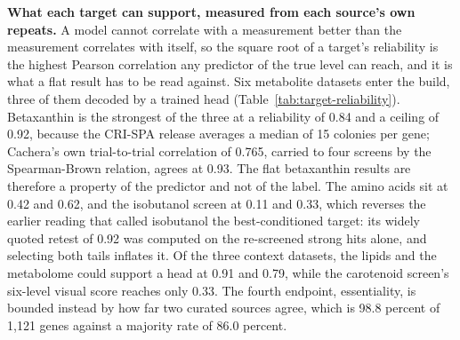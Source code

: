 
\textbf{What each target can support, measured from each source's own repeats.} A model
cannot correlate with a measurement better than the measurement correlates with itself, so
the square root of a target's reliability is the highest Pearson correlation any predictor
of the true level can reach, and it is what a flat result has to be read against. Six
metabolite datasets enter the build, three of them decoded by a trained head
(Table~\ref{tab:target-reliability}). Betaxanthin is the strongest of the three at a
reliability of 0.84 and a ceiling of 0.92, because the CRI-SPA release averages a median of
15 colonies per gene; Cachera's own trial-to-trial correlation of 0.765, carried to four
screens by the Spearman-Brown relation, agrees at 0.93. The flat betaxanthin results are
therefore a property of the predictor and not of the label. The amino acids sit at 0.42 and
0.62, and the isobutanol screen at 0.11 and 0.33, which reverses the earlier reading that
called isobutanol the best-conditioned target: its widely quoted retest of 0.92 was computed
on the re-screened strong hits alone, and selecting both tails inflates it. Of the three
context datasets, the lipids and the metabolome could support a head at 0.91 and 0.79, while
the carotenoid screen's six-level visual score reaches only 0.33. The fourth endpoint,
essentiality, is bounded instead by how far two curated sources agree, which is 98.8 percent
of 1{,}121 genes against a majority rate of 86.0 percent.

